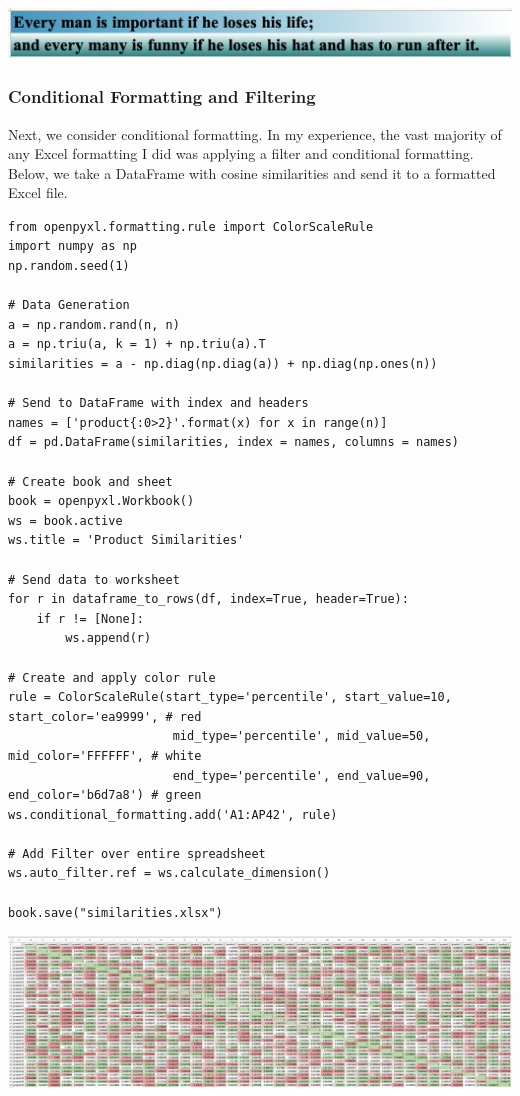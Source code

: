 \begin{center}
    \includegraphics[width = .8\textwidth]{images/excel_chesterton.png}
\end{center}

\subsubsection{Conditional Formatting and Filtering}

Next, we consider conditional formatting. In my experience, the vast majority of any Excel formatting I did was applying a filter and conditional formatting. Below, we take a DataFrame with cosine similarities and send it to a formatted Excel file. 

\begin{lstlisting}
from openpyxl.formatting.rule import ColorScaleRule
import numpy as np
np.random.seed(1)

# Data Generation
a = np.random.rand(n, n)
a = np.triu(a, k = 1) + np.triu(a).T
similarities = a - np.diag(np.diag(a)) + np.diag(np.ones(n))

# Send to DataFrame with index and headers
names = ['product{:0>2}'.format(x) for x in range(n)]
df = pd.DataFrame(similarities, index = names, columns = names)

# Create book and sheet
book = openpyxl.Workbook()
ws = book.active
ws.title = 'Product Similarities'

# Send data to worksheet
for r in dataframe_to_rows(df, index=True, header=True):
    if r != [None]:
        ws.append(r)
        
# Create and apply color rule
rule = ColorScaleRule(start_type='percentile', start_value=10, start_color='ea9999', # red
                       mid_type='percentile', mid_value=50, mid_color='FFFFFF', # white 
                       end_type='percentile', end_value=90, end_color='b6d7a8') # green
ws.conditional_formatting.add('A1:AP42', rule)

# Add Filter over entire spreadsheet
ws.auto_filter.ref = ws.calculate_dimension()

book.save("similarities.xlsx")
\end{lstlisting}


\begin{center}
    \includegraphics[width = .95\textwidth]{images/similarities.png}
\end{center}



